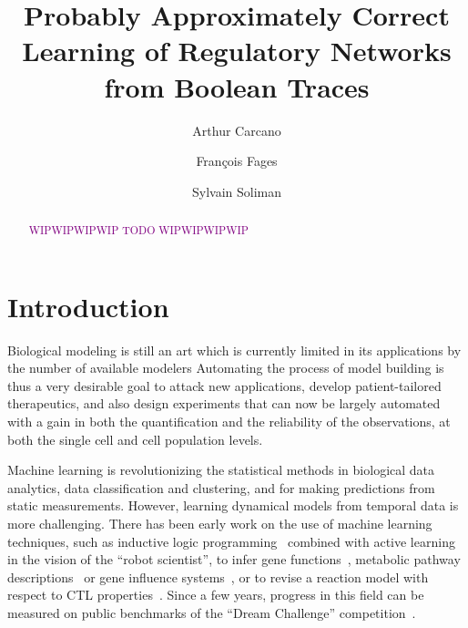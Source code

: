 \documentclass{llncs}
\newcommand{\wip}[1]{\textcolor{Purple}{WIPWIPWIPWIP #1 WIPWIPWIPWIP}}
\begin{document}
\title{Probably Approximately Correct Learning of Regulatory Networks from Boolean Traces}

\author{Arthur Carcano \and Fran\c{c}ois Fages \and Sylvain
Soliman}


\maketitle

\begin{abstract}

   \wip{TODO}

\end{abstract}

\section{Introduction}

Biological modeling is still an art which is currently limited in its applications by the number of available modelers
Automating the process of model building is thus a very desirable goal
to attack new applications, develop patient-tailored therapeutics,
and also design experiments that can now be largely automated
with a gain in both the quantification and the reliability of the observations, at both the single cell and cell population levels.

Machine learning is revolutionizing the statistical methods in biological data analytics,
data classification and clustering, and for making predictions from static measurements.
However, learning dynamical models from temporal data is more challenging.
There has been early work on the use of machine learning techniques, such as inductive
 logic programming~\cite{Muggleton95ngc} combined with active learning in the vision of the ``robot scientist'',
to infer gene functions~\cite{BMOKRK01etai},
metabolic pathway descriptions~\cite{AM02etai,AM02slps}
or gene influence systems~\cite{BCRG04jtb},
or to revise a reaction model with respect to CTL properties~\cite{CCFS06tcsb}.
Since a few years, progress in this field can be measured on public benchmarks
of the ``Dream Challenge'' competition~\cite{Meyer14bmc}.
\end{document}
